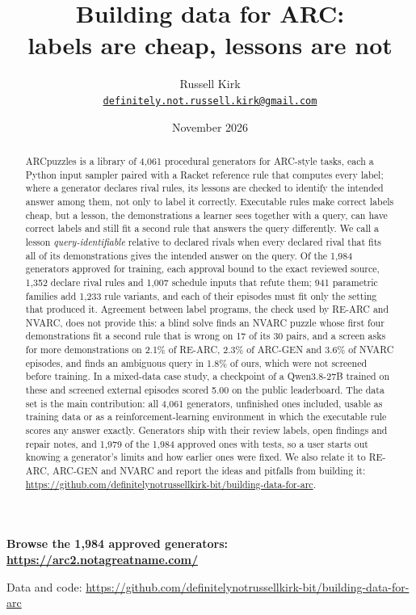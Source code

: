 \documentclass[11pt]{article}
\title{Building data for ARC:\\ labels are cheap, lessons are not}
\author{Russell Kirk \\ \href{mailto:definitely.not.russell.kirk@gmail.com}{\texttt{definitely.not.russell.kirk@gmail.com}}}
\date{November 2026}
\begin{document}
\maketitle

\begin{center}
{\large\textbf{Browse the 1,984 approved generators: \url{https://arc2.notagreatname.com/}}}

Data and code: \url{https://github.com/definitelynotrussellkirk-bit/building-data-for-arc}
\end{center}

\begin{abstract}
ARCpuzzles is a library of 4,061 procedural generators for ARC-style tasks,
each a Python input sampler paired with a Racket reference rule that computes
every label; where a generator declares rival rules, its lessons are checked
to identify the intended answer among them, not only to label it correctly.
Executable rules make correct labels cheap, but a lesson, the demonstrations a
learner sees together with a query, can have correct labels and still fit a second rule that answers the
query differently. We call a lesson \emph{query-identifiable} relative to
declared rivals when every declared rival that fits all of its demonstrations
gives the intended answer on the query. Of the 1,984 generators approved for
training, each approval bound to the exact reviewed source, 1,352 declare
rival rules and 1,007 schedule inputs that refute them; 941 parametric
families add 1,233 rule variants, and each of their episodes must fit only the
setting that produced it. Agreement between label programs, the check used by
RE-ARC and NVARC, does not provide this: a blind solve finds an NVARC puzzle
whose first four demonstrations fit a second rule that is wrong on 17 of its
30 pairs, and a screen asks for more demonstrations on 2.1\% of RE-ARC, 2.3\%
of ARC-GEN and 3.6\% of NVARC episodes, and finds an ambiguous query in 1.8\%
of ours, which were not screened before training. In a mixed-data case study,
a checkpoint of a Qwen3.8-27B trained on these and screened external episodes
scored 5.00 on the public leaderboard. The data set is the main contribution:
all 4,061 generators, unfinished ones included, usable as training data or as
a reinforcement-learning environment in which the executable rule scores any
answer exactly. Generators ship with their review labels, open findings and
repair notes, and 1,979 of the 1,984 approved ones with tests, so a user starts
out knowing a generator's limits and how earlier ones were fixed. We also relate it to RE-ARC, ARC-GEN and NVARC and report the ideas and
pitfalls from building it:
\url{https://github.com/definitelynotrussellkirk-bit/building-data-for-arc}.
\end{abstract}
\end{document}
